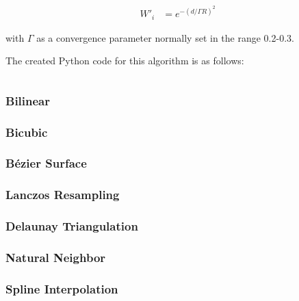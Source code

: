             \begin{align*}
                W'_{i} &= e^{-(d/\Gamma R)^{2}}
            \end{align*}

            with $\Gamma$ as a convergence parameter normally set in the range 0.2-0.3.

            The created Python code for this algorithm is as follows:

            \inputminted[mathescape,linenos,numbersep=5pt,frame=lines,framesep=2mm]{python}{./code/barnes.py}

        \subsubsection{Bilinear}\label{background_interpolation_methods_bilinear}


        
        \subsubsection{Bicubic}\label{background_interpolation_methods_bicubic}
        
        \subsubsection{B\'{e}zier Surface}\label{background_interpolation_methods_beziersurface}
        
        \subsubsection{Lanczos Resampling}\label{background_interpolation_methods_lanczosresampling}
        
        \subsubsection{Delaunay Triangulation}\label{background_interpolation_methods_delaunaytriangulation}
        
        \subsubsection{Natural Neighbor}\label{background_interpolation_methods_naturalneighbour}
        
        \subsubsection{Spline Interpolation}\label{background_interpolation_methods_splineinterpolation}

